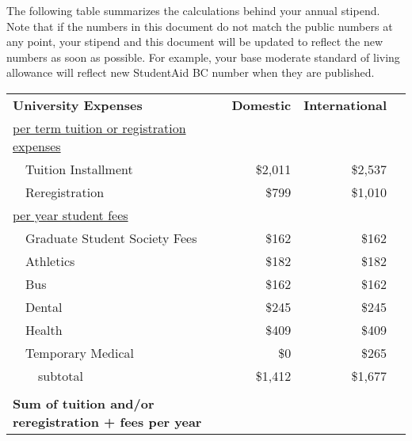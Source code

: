 \documentclass[11pt]{article}
\begin{document}
The following table summarizes the calculations behind your annual stipend.
Note that if the numbers in this document do not match the public numbers at any point, your stipend and this document will be updated to reflect the new numbers as soon as possible.
For example, your base moderate standard of living allowance will reflect new StudentAid BC number when they are published.
\begin{center}
	\begin{tabular}{lrrr}
		\textbf{University Expenses}                                    & \textbf{Domestic} & \textbf{International}   \\
		\underline{per term tuition or registration expenses}           &                   &                          \\
		~~Tuition Installment                                           & \$2,011           & \$2,537                  \\
		~~Reregistration                                                & \$799             & \$1,010                  \\
		\underline{per year student fees}                               &                   &                          \\
		~~Graduate Student Society Fees                                 & \$162             & \$162                    \\
		~~Athletics                                                     & \$182             & \$182                    \\
		~~Bus                                                           & \$162             & \$162                    \\
		~~Dental                                                        & \$245             & \$245                    \\
		~~Health                                                        & \$409             & \$409                    \\
		~~Temporary Medical                                             & \$0               & \$265                    \\
		~~~~{subtotal}                                                  & \$1,412           & \$1,677                  \\
		                                                                &                   &                        & \\
		\textbf{Sum of tuition and/or reregistration + fees per year}   &                   &                          \\

\end{tabular}
\end{center}
\end{document}
